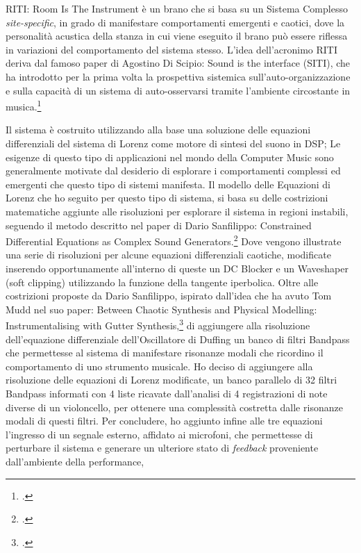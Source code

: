 RITI: Room Is The Instrument è un brano che si basa su un Sistema Complesso \textit{site-specific},
in grado di manifestare comportamenti emergenti e caotici,
dove la personalità acustica della stanza in cui viene eseguito il brano può
essere riflessa in variazioni del comportamento del sistema stesso.
L'idea dell'acronimo RITI deriva dal famoso paper di Agostino Di Scipio: 
Sound is the interface (SITI), 
che ha introdotto per la prima volta la prospettiva sistemica 
sull'auto-organizzazione e sulla capacità di un sistema di auto-osservarsi 
tramite l'ambiente circostante in musica.\footcite{di_scipio_sound_2003} 

Il sistema è costruito utilizzando alla base una soluzione 
delle equazioni differenziali del sistema di Lorenz come motore di sintesi del suono in DSP;
Le esigenze di questo tipo di applicazioni nel mondo della Computer Music
sono generalmente motivate dal desiderio di esplorare i comportamenti complessi ed emergenti
che questo tipo di sistemi manifesta.
Il modello delle Equazioni di Lorenz che ho seguito per questo tipo di sistema, si basa
su delle costrizioni matematiche aggiunte alle risoluzioni
per esplorare il sistema in regioni instabili, 
seguendo il metodo descritto nel paper di Dario Sanfilippo: 
Constrained Differential Equations as Complex Sound Generators.\footcite{sanfilippo_constrained_2021} 
Dove vengono illustrate una serie di risoluzioni per alcune 
equazioni differenziali caotiche,
modificate inserendo opportunamente all'interno di queste un
DC Blocker e un Waveshaper (soft clipping) utilizzando la funzione della tangente iperbolica.
Oltre alle costrizioni proposte da Dario Sanfilippo, 
ispirato dall'idea che ha avuto Tom Mudd nel suo paper:
Between Chaotic Synthesis and Physical Modelling: Instrumentalising with Gutter Synthesis,\footcite{tom_mudd_gutter_synthesis}
di aggiungere alla risoluzione dell'equazione differenziale dell'Oscillatore di Duffing
un banco di filtri Bandpass che permettesse al sistema di manifestare
risonanze modali che ricordino il comportamento di uno strumento musicale.
Ho deciso di aggiungere alla risoluzione delle equazioni di Lorenz modificate,
un banco parallelo di 32 filtri Bandpass informati 
con 4 liste ricavate dall'analisi di 4 registrazioni di note diverse di un violoncello, 
per ottenere una complessità costretta dalle risonanze modali di questi filtri.
Per concludere, ho aggiunto infine alle tre equazioni l'ingresso di un segnale esterno, 
affidato ai microfoni, 
che permettesse di perturbare il sistema e generare un ulteriore stato 
di \emph{feedback} proveniente dall'ambiente della performance,
